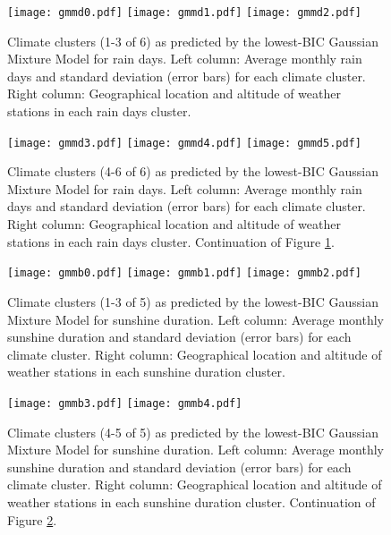 \documentclass[12pt]{iopart}
\begin{document}
\begin{figure}
\begin{center}
\texttt{[image: gmmd0.pdf]}
\texttt{[image: gmmd1.pdf]}
\texttt{[image: gmmd2.pdf]}
\caption{Climate clusters (1-3 of 6) as predicted by the lowest-BIC Gaussian Mixture Model for rain days. Left column: Average monthly rain days and standard deviation (error bars) for each climate cluster. Right column: Geographical location and altitude of weather stations in each rain days cluster.}\label{clustd}
\end{center}
\end{figure}

\begin{figure}
\begin{center}
\texttt{[image: gmmd3.pdf]}
\texttt{[image: gmmd4.pdf]}
\texttt{[image: gmmd5.pdf]}
\caption{Climate clusters (4-6 of 6) as predicted by the lowest-BIC Gaussian Mixture Model for rain days. Left column: Average monthly rain days and standard deviation (error bars) for each climate cluster. Right column: Geographical location and altitude of weather stations in each rain days cluster. Continuation of Figure \ref{clustd}.}
\end{center}
\end{figure}

\begin{figure}
\begin{center}
\texttt{[image: gmmb0.pdf]}
\texttt{[image: gmmb1.pdf]}
\texttt{[image: gmmb2.pdf]}
\caption{Climate clusters (1-3 of 5) as predicted by the lowest-BIC Gaussian Mixture Model for sunshine duration. Left column: Average monthly sunshine duration and standard deviation (error bars) for each climate cluster. Right column: Geographical location and altitude of weather stations in each sunshine duration cluster.}\label{clustb1}
\end{center}
\end{figure}

\begin{figure}
\begin{center}
\texttt{[image: gmmb3.pdf]}
\texttt{[image: gmmb4.pdf]}
\caption{Climate clusters (4-5 of 5) as predicted by the lowest-BIC Gaussian Mixture Model for sunshine duration. Left column: Average monthly sunshine duration and standard deviation (error bars) for each climate cluster. Right column: Geographical location and altitude of weather stations in each sunshine duration cluster. Continuation of Figure \ref{clustb1}.}\label{clustb}
\end{center}
\end{figure}
\end{document}
